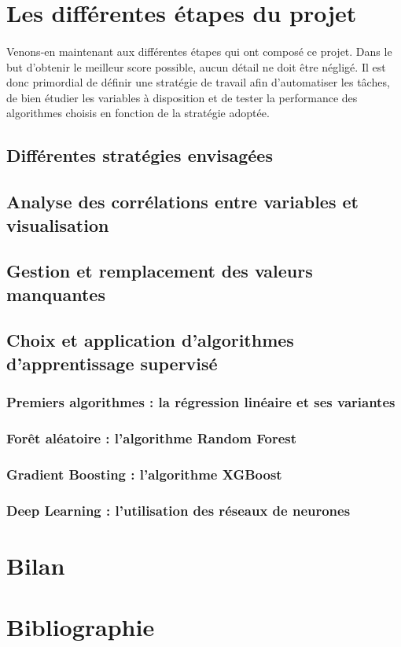 \documentclass[14pt, openany]{article}
\begin{document}
\section{Les différentes étapes du projet}
\paragraph{}
Venons-en maintenant aux différentes étapes qui ont composé ce projet. Dans le but d'obtenir le meilleur score possible, aucun détail ne doit être négligé. Il est donc primordial de définir une stratégie de travail afin d'automatiser les tâches, de bien étudier les variables à disposition et de tester la performance des algorithmes choisis en fonction de la stratégie adoptée.
\subsection{Différentes stratégies envisagées}

\subsection{Analyse des corrélations entre variables et visualisation}

\subsection{Gestion et remplacement des valeurs manquantes}

\subsection{Choix et application d'algorithmes d'apprentissage supervisé}

\subsubsection{Premiers algorithmes : la régression linéaire et ses variantes}

\subsubsection{Forêt aléatoire : l'algorithme Random Forest}

\subsubsection{Gradient Boosting : l'algorithme XGBoost}

\subsubsection{Deep Learning : l'utilisation des réseaux de neurones}

\section{Bilan}

\section{Bibliographie}
\end{document}
